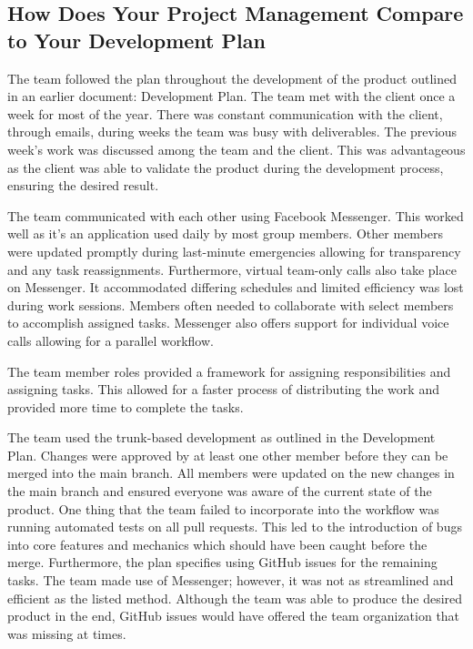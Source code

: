 \documentclass{article}
\begin{document}
\subsection{How Does Your Project Management Compare to Your Development Plan}


The team followed the plan throughout the development of the product outlined in an earlier document: Development Plan. The team met with the client once a week for most of the year. There was constant communication with the client, through emails, during weeks the team was busy with deliverables. The previous week's work was discussed among the team and the client. This was advantageous as the client was able to validate the product during the development process, ensuring the desired result.

The team communicated with each other using Facebook Messenger. This worked well as it's an application used daily by most group members. Other members were updated promptly during last-minute emergencies allowing for transparency and any task reassignments. Furthermore, virtual team-only calls also take place on Messenger. It accommodated differing schedules and limited efficiency was lost during work sessions. Members often needed to collaborate with select members to accomplish assigned tasks. Messenger also offers support for individual voice calls allowing for a parallel workflow. 

The team member roles provided a framework for assigning responsibilities and assigning tasks. This allowed for a faster process of distributing the work and provided more time to complete the tasks.

The team used the trunk-based development as outlined in the Development Plan. Changes were approved by at least one other member before they can be merged into the main branch. All members were updated on the new changes in the main branch and ensured everyone was aware of the current state of the product. One thing that the team failed to incorporate into the workflow was running automated tests on all pull requests. This led to the introduction of bugs into core features and mechanics which should have been caught before the merge. Furthermore, the plan specifies using GitHub issues for the remaining tasks. The team made use of Messenger; however, it was not as streamlined and efficient as the listed method. Although the team was able to produce the desired product in the end, GitHub issues would have offered the team organization that was missing at times.
\end{document}

